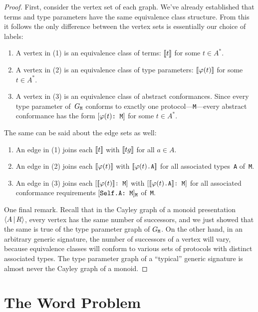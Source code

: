 \documentclass[../generics]{subfiles}
\begin{document}
\begin{proof}
First, consider the vertex set of each graph. We've already established that terms and type parameters have the same equivalence class structure. From this it follows the only difference between the vertex sets is essentially our choice of labels:
\begin{enumerate}
\item A vertex in (1) is an equivalence class of terms: $[\![t]\!]$ for some $t\in A^*$.
\item A vertex in (2) is an equivalence class of type parameters: $[\![\varphi(t)]\!]$ for some $t\in A^*$.
\item A vertex in (3) is an equivalence class of abstract conformances. Since every type parameter of~$G_\texttt{M}$ conforms to exactly one protocol---\texttt{M}---every abstract conformance has the form $[\texttt{$\varphi(t)$:~M}]$ for some $t\in A^*$.
\end{enumerate}
The same can be said about the edge sets as well:
\begin{enumerate}
\item An edge in (1) joins each $[\![t]\!]$ with $[\![tg]\!]$ for all $a\in A$.
\item An edge in (2) joins each $[\![\varphi(t)]\!]$ with $[\![\varphi(t)\texttt{.A}]\!]$ for all associated types~\texttt{A} of~\texttt{M}.
\item An edge in (3) joins each $[\texttt{$[\![\varphi(t)]\!]$:~M}]$ with $[\texttt{$[\![\varphi(t)\texttt{.A}]\!]$:~M}]$ for all associated conformance requirements $[\texttt{Self.A:~M}]_{\texttt{M}}$ of~\texttt{M}.
\end{enumerate}

One final remark. Recall that in the Cayley graph of a monoid presentation~$\langle A\,|\,R\rangle$, every vertex has the same number of successors, and we just showed that the same is true of the type parameter graph of $G_\texttt{M}$. On the other hand, in an arbitrary generic signature, the number of successors of a vertex will vary, because equivalence classes will conform to various sets of protocols with distinct associated types. The type parameter graph of a ``typical'' generic signature is almost never the Cayley graph of a monoid.
\end{proof}

\section{The Word Problem}\label{word problem}
\end{document}

